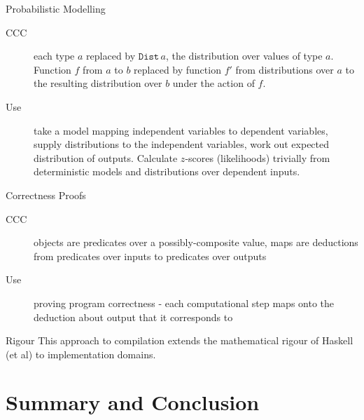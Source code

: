 \documentclass[10pt]{beamer}
\newcommand{\Dist}[1]{\ensuremath{\mathtt{Dist}\,#1}}
\theoremstyle{definition}
\theoremstyle{remark}
\numberwithin{equation}{section}
\begin{document}
\begin{frame}[fragile]{Probabilistic Modelling}
  \begin{description}
  \item[CCC] each type $a$ replaced by $\Dist{a}$, the distribution over values of type $a$. Function $f$ from $a$ to $b$ replaced by function $f'$ from distributions over $a$ to the resulting distribution over $b$ under the action of $f$.
  \item[Use] take a model mapping independent variables to dependent variables, supply distributions to the independent variables, work out expected distribution of outputs. Calculate $z$-scores (likelihoods) trivially from deterministic models and distributions over dependent inputs.
  \end{description}
\end{frame}

\begin{frame}[fragile]{Correctness Proofs}
  \begin{description}
  \item[CCC] objects are predicates over a possibly-composite value, maps are deductions from predicates over inputs to predicates over outputs
  \item[Use] proving program correctness - each computational step maps onto the deduction about output that it corresponds to
  \end{description}
\end{frame}

\begin{frame}[fragile]{Rigour}
  This approach to compilation extends the mathematical rigour of Haskell (et al) to implementation domains.
\end{frame}

\section{Summary and Conclusion} %
\end{document}
